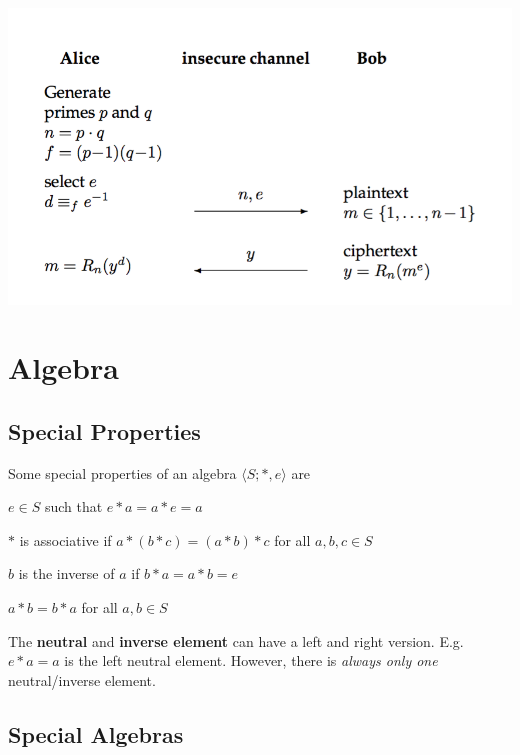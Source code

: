 \documentclass[11pt]{article}
\begin{document}
\begin{center}
	\includegraphics[width=400pt]{images/rsa}
\end{center}

\section{Algebra}

\subsection{Special Properties}

Some special properties of an algebra $\langle S; *, e\rangle$ are

\begin{description}[labelindent=16pt,style=multiline,leftmargin=5.5cm, noitemsep]
	\item[neutral element:] $e \in S$ such that $e * a = a * e = a$
	\item[associativity:] $*$ is associative if $a *(b*c) = (a*b)*c$ for all $a,b,c \in S$ 
	\item[inverse element:] $b$ is the inverse of $a$ if $b * a = a*b = e$
	\item[commutative/abelian:] $a*b = b*a$ for all $a,b \in S$
\end{description}

The \textbf{neutral} and \textbf{inverse element} can have a left and right version. E.g. $e * a = a$ is the left neutral element. However, there is \emph{always only one} neutral/inverse element.

\subsection{Special Algebras}
\end{document}
